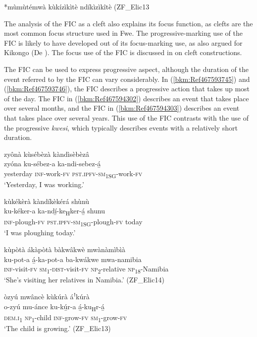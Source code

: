 \ea
\label{bkm:Ref72310343}
*mùmùtémwà kùkízìkìtè ndíkìzìkîtè (ZF\_Elic13\label{bkm:Ref469495204}
\z

The analysis of the FIC as a cleft also explains its focus function, as clefts are the most common focus structure used in Fwe. The progressive-marking use of the FIC is likely to have developed out of its focus-marking use, as also argued for Kikongo (De \citealt{KindEtAl2015}). The focus use of the FIC is discussed in  on cleft constructions.

The FIC can be used to express progressive aspect, although the duration of the event referred to by the FIC can vary considerably. In (\ref{bkm:Ref467593745}) and (\ref{bkm:Ref467593746}), the FIC describes a progressive action that takes up most of the day. The FIC in (\ref{bkm:Ref467594302}) describes an event that takes place over several months, and the FIC in (\ref{bkm:Ref467594303}) describes an event that takes place over several years. This use of the FIC contrasts with the use of the progressive \textit{kwesi}, which typically describes events with a relatively short duration.

\ea
\label{bkm:Ref467593745}
zyônà kùsébèzà kàndìsèbèzâ\\
\gll zyóna    ku-sébez-a  ka-ndi-sebez-á̲\\
yesterday  \textsc{inf}-work-\textsc{fv}  \textsc{pst}.\textsc{ipfv}-\textsc{sm}\textsubscript{1SG}-work-\textsc{fv}\\
\glt ‘Yesterday, I was working.’
\z

\ea
\label{bkm:Ref467593746}
kùkékèrà kàndíkèkérá shùnù\\
\gll ku-kéker-a    ka-ndí̲-ke\textsubscript{H}ker-á̲    shunu\\
\textsc{inf}-plough-\textsc{fv}  \textsc{pst}.\textsc{ipfv}-\textsc{sm}\textsubscript{1SG}-plough-\textsc{fv}  today\\
\glt ‘I was ploughing today.’
\z

\ea
\label{bkm:Ref467594302}
kùpòtà ákàpòtà bàkwâkwè mwànàmìbìà\\
\gll ku-pot-a  á̲-ka-pot-a    ba-kwákwe  mwa-namibia\\
\textsc{inf}-visit-\textsc{fv}  \textsc{sm}\textsubscript{1}-\textsc{dist}-visit-\textsc{fv}  \textsc{np}\textsubscript{2}-relative  \textsc{np}\textsubscript{18}-Namibia\\
\glt ‘She’s visiting her relatives in Namibia.’ (ZF\_Elic14)
\z

\ea
\label{bkm:Ref467594303}
òzyú mwâncè kùkúrà áꜝkúrà\\
\gll o-zyú  mu-ánce  ku-kú̲r-a  á̲-ku\textsubscript{H}r-á̲\\
\textsc{dem}.\textsc{i}\textsubscript{1}  \textsc{np}\textsubscript{1}-child  \textsc{inf}-grow-\textsc{fv}  \textsc{sm}\textsubscript{1}-grow-\textsc{fv}\\
\glt ‘The child is growing.’ (ZF\_Elic13)
\z

